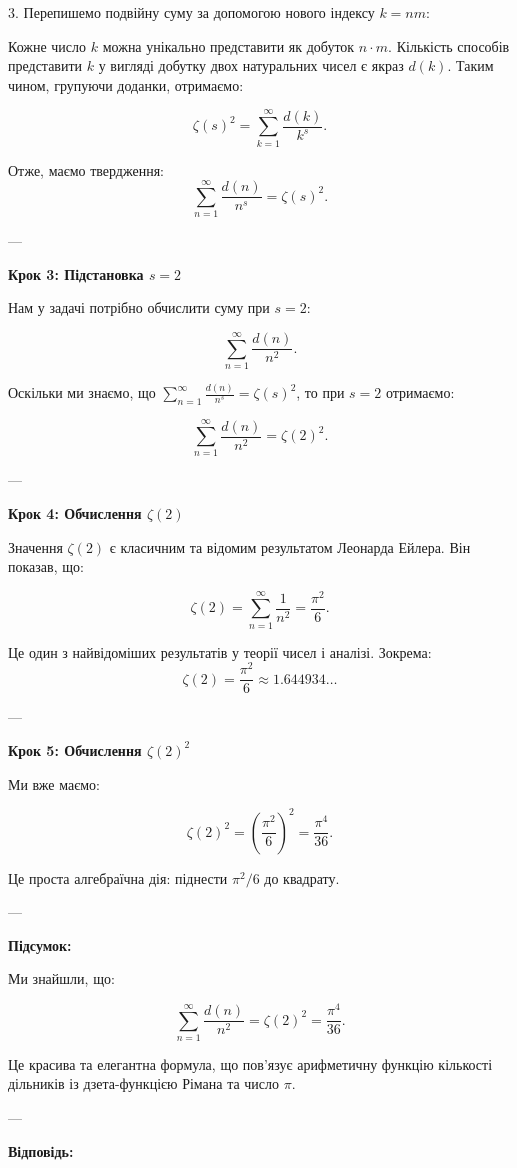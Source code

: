 \documentclass{article}
\begin{document}
3. Перепишемо подвійну суму за допомогою нового індексу \( k = nm \):

   Кожне число \( k \) можна унікально представити як добуток \( n \cdot m \). Кількість способів представити \( k \) у вигляді добутку двох натуральних чисел є якраз \( d(k) \). Таким чином, групуючи доданки, отримаємо:

   \[
   \zeta(s)^2 = \sum_{k=1}^{\infty} \frac{d(k)}{k^s}.
   \]

Отже, маємо твердження:
\[
\sum_{n=1}^{\infty} \frac{d(n)}{n^s} = \zeta(s)^2.
\]

---

\textbf{Крок 3: Підстановка \( s = 2 \)}

Нам у задачі потрібно обчислити суму при \( s=2 \):

\[
\sum_{n=1}^{\infty} \frac{d(n)}{n^2}.
\]

Оскільки ми знаємо, що \(\sum_{n=1}^{\infty} \frac{d(n)}{n^s} = \zeta(s)^2\), то при \( s=2 \) отримаємо:

\[
\sum_{n=1}^{\infty} \frac{d(n)}{n^2} = \zeta(2)^2.
\]

---

\textbf{Крок 4: Обчислення \(\zeta(2)\)}

Значення \(\zeta(2)\) є класичним та відомим результатом Леонарда Ейлера. Він показав, що:

\[
\zeta(2) = \sum_{n=1}^{\infty} \frac{1}{n^2} = \frac{\pi^2}{6}.
\]

Це один з найвідоміших результатів у теорії чисел і аналізі. Зокрема:
\[
\zeta(2) = \frac{\pi^2}{6} \approx 1.644934\dots
\]

---

\textbf{Крок 5: Обчислення \(\zeta(2)^2\)}

Ми вже маємо:

\[
\zeta(2)^2 = \left(\frac{\pi^2}{6}\right)^2 = \frac{\pi^4}{36}.
\]

Це проста алгебраїчна дія: піднести \(\pi^2/6\) до квадрату.

---

\textbf{Підсумок:}

Ми знайшли, що:

\[
\sum_{n=1}^{\infty} \frac{d(n)}{n^2} = \zeta(2)^2 = \frac{\pi^4}{36}.
\]

Це красива та елегантна формула, що пов’язує арифметичну функцію кількості дільників із дзета-функцією Рімана та число \(\pi\).

---

\textbf{Відповідь:}
\end{document}
